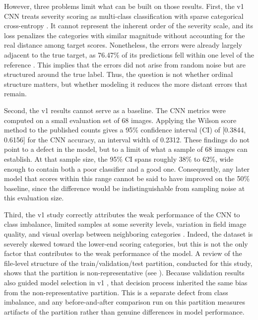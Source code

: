 \documentclass{icsthesis}
\newcommand{\secref}[1]{\textit{\nameref{#1}}}
\begin{document}
\begin{mainmatter}
				However, three problems limit what can be built on those results. First, the v1 CNN
				treats severity scoring as multi-class classification with sparse categorical
				cross-entropy \citep{casasola2026}. It cannot represent the inherent order of the
				severity scale, and its loss penalizes the categories with similar magnitude without
				accounting for the real distance among target scores. Nonetheless, the errors were
				already largely adjacent to the true target, as 76.47\% of its predictions fell
				within one level of the reference \citep{casasola2026}. This implies that the errors
				did not arise from random noise but are structured around the true label. Thus, the
				question is not whether ordinal structure matters, but whether modeling it reduces
				the more distant errors that remain.

				Second, the v1 results cannot serve as a baseline. The CNN metrics were computed on
				a small evaluation set of 68 images. Applying the Wilson score method to the
				published counts gives a 95\% confidence interval (CI) of [0.3844, 0.6156] for the
				CNN accuracy, an interval width of 0.2312. These findings do not point to a defect
				in the model, but to a limit of what a sample of 68 images can establish. At that
				sample size, the 95\% CI spans roughly 38\% to 62\%, wide enough to contain both a
				poor classifier and a good one. Consequently, any later model that scores within
				this range cannot be said to have improved on the 50\% baseline, since the
				difference would be indistinguishable from sampling noise at this evaluation size.

				Third, the v1 study correctly attributes the weak performance of the CNN to class
				imbalance, limited samples at some severity levels, variation in field image
				quality, and visual overlap between neighboring categories \citep{casasola2026}.
				Indeed, the dataset is severely skewed toward the lower-end scoring categories, but
				this is not the only factor that contributes to the weak performance of the model. A
				review of the file-level structure of the train/validation/test partition, conducted
				for this study, shows that the partition is non-representative (see
				\secref{sec:discard}). Because validation results also guided model selection in v1
				\citep{casasola2026}, that decision process inherited the same bias from the
				non-representative partition. This is a separate defect from class imbalance, and
				any before-and-after comparison run on this partition measures artifacts of the
				partition rather than genuine differences in model performance.


\end{mainmatter}
\end{document}
